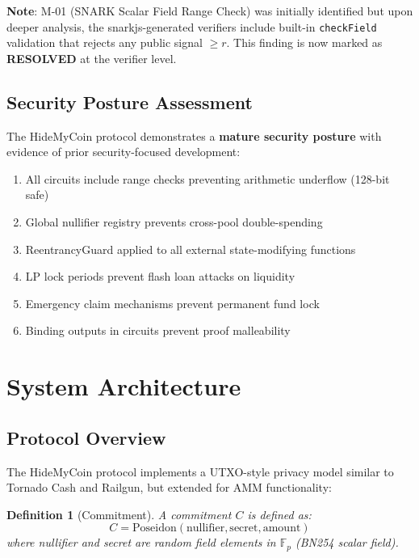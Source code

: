\documentclass[11pt,a4paper]{article}
\newtheorem{definition}[theorem]{Definition}
\begin{document}
\textbf{Note}: M-01 (SNARK Scalar Field Range Check) was initially identified but upon deeper analysis, the snarkjs-generated verifiers include built-in \texttt{checkField} validation that rejects any public signal $\geq r$. This finding is now marked as \textbf{RESOLVED} at the verifier level.

\subsection{Security Posture Assessment}

The HideMyCoin protocol demonstrates a \textbf{mature security posture} with evidence of prior security-focused development:

\begin{enumerate}
    \item All circuits include range checks preventing arithmetic underflow (128-bit safe)
    \item Global nullifier registry prevents cross-pool double-spending
    \item ReentrancyGuard applied to all external state-modifying functions
    \item LP lock periods prevent flash loan attacks on liquidity
    \item Emergency claim mechanisms prevent permanent fund lock
    \item Binding outputs in circuits prevent proof malleability
\end{enumerate}

\section{System Architecture}

\subsection{Protocol Overview}

The HideMyCoin protocol implements a UTXO-style privacy model similar to Tornado Cash and Railgun, but extended for AMM functionality:

\begin{definition}[Commitment]
A commitment $C$ is defined as:
\begin{equation}
C = \text{Poseidon}(\text{nullifier}, \text{secret}, \text{amount})
\end{equation}
where nullifier and secret are random field elements in $\mathbb{F}_p$ (BN254 scalar field).
\end{definition}
\end{document}
